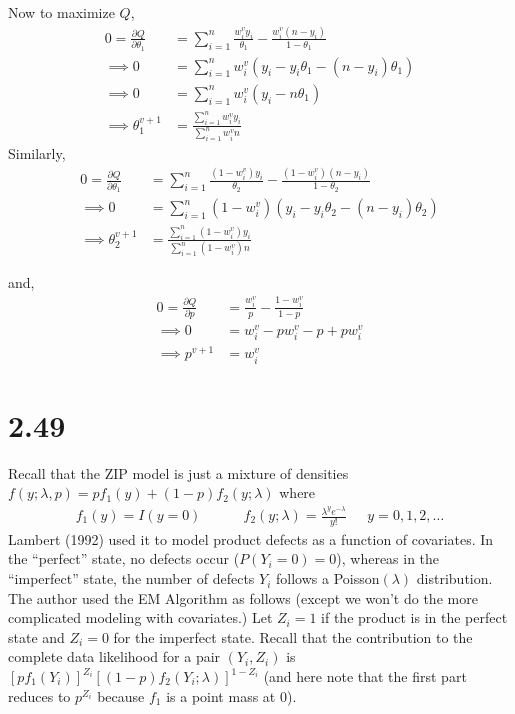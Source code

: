 \documentclass[
  letterpaper,
  DIV=11,
  numbers=noendperiod]{scrreprt}
\begin{document}
Now to maximize \(Q\), \[ \begin{aligned}
0= \frac{\partial Q}{\partial \theta_1} &=\sum_{i=1}^n \frac{w_i^vy_i}{\theta_1}-\frac{w_i^v(n-y_i)}{1-\theta_1} \\
\implies 0&= \sum_{i=1}^n w_i^v(y_i-y_i\theta_1-(n-y_i)\theta_1)\\
\implies 0&= \sum_{i=1}^n w_i^v(y_i-n\theta_1)\\
\implies \theta_1^{v+1} &= \frac{\sum_{i=1}^n w_i^vy_i}{\sum_{i=1}^n w_i^vn}
\end{aligned}
\] Similarly, \[ \begin{aligned}
0= \frac{\partial Q}{\partial \theta_1} &=\sum_{i=1}^n \frac{(1-w_i^v)y_i}{\theta_2}-\frac{(1-w_i^v)(n-y_i)}{1-\theta_2} \\
\implies 0&= \sum_{i=1}^n (1-w_i^v)(y_i-y_i\theta_2-(n-y_i)\theta_2)\\
\implies \theta_2^{v+1} &= \frac{\sum_{i=1}^n (1-w_i^v)y_i}{\sum_{i=1}^n (1-w_i^v)n}
\end{aligned}
\]

and, \[\begin{aligned}
0=\frac{\partial Q}{\partial p} &=\frac{w_i^v}{p}-\frac{1-w_i^v}{1-p} \\
\implies 0&= w_i^v-pw_i^v-p+pw_i^v \\
\implies p^{v+1} &= w_i^v
\end{aligned}\]

\newpage

\hypertarget{section-19}{%
\section{2.49}\label{section-19}}

Recall that the ZIP model is just a mixture of densities
\(f(y;\lambda, p) =pf_1(y)+(1-p)f_2(y;\lambda)\) where
\[\begin{aligned}f_1(y)=I(y=0)~&~~~~~~~~~f_2(y;\lambda)= \frac{\lambda^ye^{-\lambda}}{y!}~&~~y=0,1,2,\dots\end{aligned}\]
Lambert (1992) used it to model product defects as a function of
covariates. In the ``perfect'' state, no defects occur
(\(P(Y_i= 0)= 0\)), whereas in the ``imperfect'' state, the number of
defects \(Y_i\) follows a Poisson\((\lambda)\) distribution. The author
used the EM Algorithm as follows (except we won't do the more
complicated modeling with covariates.) Let \(Z_i = 1\) if the product is
in the perfect state and \(Z_i = 0\) for the imperfect state. Recall
that the contribution to the complete data likelihood for a pair
\((Y_i,Z_i)\) is \([pf_1(Y_i)]^{Z_i}[(1-p)f_2(Y_i;\lambda)]^{1-Z_i}\)
(and here note that the first part reduces to \(p^{Z_i}\) because
\(f_1\) is a point mass at 0).
\end{document}
